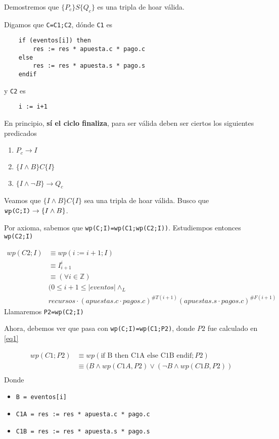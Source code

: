 \documentclass[../document.tex]{subfiles}
\begin{document}
Demostremos que $\{P_c\}S\{Q_c\}$ es una tripla de hoar válida.

Digamos que \verb+C=C1;C2+, dónde \verb+C1+ es
\begin{verbatim}
    if (eventos[i]) then
        res := res * apuesta.c * pago.c
    else
        res := res * apuesta.s * pago.s
    endif
\end{verbatim}

y \verb+C2+ es
\begin{verbatim}
    i := i+1
\end{verbatim}

En principio, \textbf{sí el ciclo finaliza}, para ser válida deben ser ciertos los siguientes predicados
\begin{enumerate}
    \item $P_c \to I$
    \item $\{I \land B\}C\{I\}$
    \item $\{I \land \neg B\} \to Q_c$
\end{enumerate}

Veamos que $\{I \land B\}C\{I\}$ sea una tripla de hoar válida. Busco que $\verb+wp(C;I)+ \to \{I \land B\}$.

Por axioma, sabemos que \verb+wp(C;I)=wp(C1;wp(C2;I))+. Estudiempos entonces \verb|wp(C2;I)|

\begin{equation} \label{eq1}
\begin{split}
wp(C2;I) & \equiv wp(i := i+1;I) \\
         & \equiv I^{i}_{i+1} \\
         & \equiv (\forall i \in \mathbb{Z})\\
         &(0\leq i+1 \leq |eventos| \land_L\\ 
         &recursos \cdot (apuestas.c\cdot pagos.c)^{\#T(i+1)}(apuestas.s\cdot pagos.c)^{\#F(i+1)}
\end{split}
\end{equation}
Llamaremos \verb|P2=wp(C2;I)|

Ahora, debemos ver que pasa con \verb+wp(C;I)=wp(C1;P2)+, donde $P2$ fue calculado en \ref{eq1}

\begin{equation} \label{eq2}
\begin{split}
wp(C1;P2) & \equiv wp(\text{if B then C1A else C1B endif};P2) \\
          & \equiv (B \land wp(C1A, P2) \lor (\neg B \land wp(C1B, P2)) \\
\end{split}
\end{equation}
Donde
\begin{itemize}
    \item \verb|B = eventos[i]|
    \item \verb|C1A = res := res * apuesta.c * pago.c|
    \item \verb|C1B = res := res * apuesta.s * pago.s|
\end{itemize}
\end{document}
